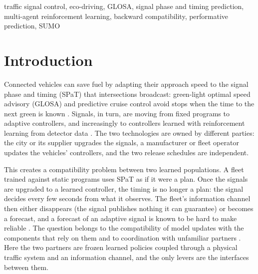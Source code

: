 \begin{IEEEkeywords}
traffic signal control, eco-driving, GLOSA, signal phase and timing prediction, multi-agent reinforcement learning, backward
compatibility, performative prediction, SUMO
\end{IEEEkeywords}

\section{Introduction}\label{sec:intro}
Connected vehicles can save fuel by adapting their approach speed to the signal phase and timing (SPaT) that intersections broadcast:
green-light optimal speed advisory (GLOSA) and predictive cruise control avoid stops when the time to the next green is known
\cite{katsaros2011,asadi2011}. Signals, in turn, are moving from fixed programs to adaptive controllers, and increasingly to controllers
learned with reinforcement learning from detector data \cite{varaiya2013,wei2018,wei2019,ault2021}. The two technologies are owned by
different parties: the city or its supplier upgrades the signals, a manufacturer or fleet operator updates the vehicles' controllers, and
the two release schedules are independent.

This creates a compatibility problem between two learned populations. A fleet trained against static programs uses SPaT as if it were a
plan. Once the signals are upgraded to a learned controller, the timing is no longer a plan: the signal decides every few seconds from what
it observes. The fleet's information channel then either disappears (the signal publishes nothing it can guarantee) or becomes a forecast,
and a forecast of an adaptive signal is known to be hard to make reliable \cite{stevanovic2013,bodenheimer2014,mahler2014,genser2024,eteifa2025}. The
question belongs to the compatibility of model updates with the components that rely on them \cite{bansal2019,shen2020,yan2021} and to
coordination with unfamiliar partners \cite{stone2010,hu2020}. Here the two partners are frozen learned policies coupled through a
physical traffic system and an information channel, and the only levers are the interfaces between them.

